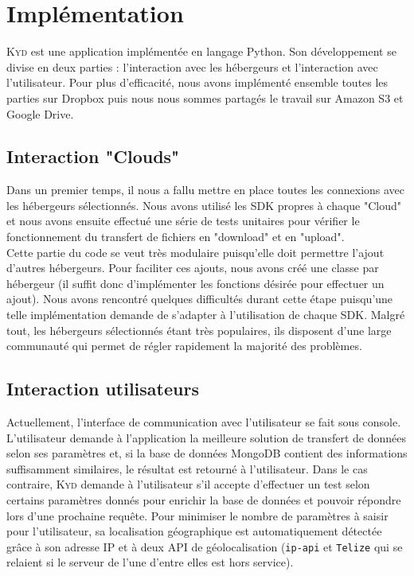 \documentclass[10pt]{article}
\newcommand{\KYD}{\textsc{Kyd}\xspace}
\begin{document}
\section{Implémentation}

\KYD est une application implémentée en langage Python. Son
développement se divise en deux parties : l'interaction avec les
hébergeurs et l'interaction avec l'utilisateur. Pour plus
d'efficacité, nous avons implémenté ensemble toutes les parties sur
Dropbox puis nous nous sommes partagés le travail sur Amazon S3 et
Google Drive.

\subsection{Interaction "Clouds"}

Dans un premier temps, il nous a fallu mettre en place toutes les
connexions avec les hébergeurs sélectionnés. Nous avons utilisé les
SDK propres à chaque "Cloud" et nous avons ensuite effectué une série
de tests unitaires pour vérifier le fonctionnement du transfert de
fichiers en "download" et en "upload".\\

Cette partie du code se veut très modulaire puisqu'elle doit permettre
l'ajout d'autres hébergeurs. Pour faciliter ces ajouts, nous avons
créé une classe par hébergeur (il suffit donc d'implémenter les
fonctions désirée pour effectuer un ajout). Nous avons rencontré
quelques difficultés durant cette étape puisqu'une telle
implémentation demande de s'adapter à l'utilisation de chaque
SDK. Malgré tout, les hébergeurs sélectionnés étant très populaires,
ils disposent d'une large communauté qui permet de régler rapidement
la majorité des problèmes.

\subsection{Interaction utilisateurs}

Actuellement, l'interface de communication avec l'utilisateur se fait
sous console. L'utilisateur demande à l'application la meilleure
solution de transfert de données selon ses paramètres et, si la base
de données MongoDB contient des informations suffisamment similaires,
le résultat est retourné à l'utilisateur. Dans le cas contraire, \KYD
demande à l'utilisateur s'il accepte d'effectuer un test selon
certains paramètres donnés pour enrichir la base de données et pouvoir
répondre lors d'une prochaine requête. Pour minimiser le nombre de
paramètres à saisir pour l'utilisateur, sa localisation géographique
est automatiquement détectée grâce à son adresse IP et à deux API de
géolocalisation (\verb!ip-api! et \verb!Telize! qui se relaient si le serveur de
l'une d'entre elles est hors service).\\
\end{document}
